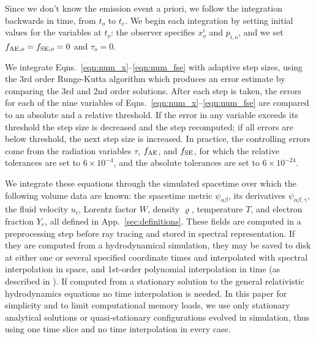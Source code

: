 \documentclass[aps,floatfix,prd,superscriptaddress,twocolumn]{revtex4-1}
\begin{document}
Since we don't know the emission event a priori,
we follow the integration backwards in time,
from $t_o$ to $t_e$.
We begin each integration by setting initial values for the variables at $t_o$:
the observer specifies $x^i_o$ and $p_{i,o}$,
and we set $f_{{\rm AE},o}=f_{{\rm SE},o}=0$ and $\tau_o=0$.

We integrate Eqns.~\ref{eqn:num_x}--\ref{eqn:num_fse} with adaptive step sizes,
using the 3rd order Runge-Kutta algorithm
which produces an error estimate by comparing the 3rd and 2nd order solutions.
After each step is taken, the errors for each of the nine variables of
Eqns.~\ref{eqn:num_x}--\ref{eqn:num_fse} are compared to an absolute and
a relative threshold.
If the error in any variable exceeds its threshold
the step size is decreased and the step recomputed;
if all errors are below threshold, the next step size is increased.
In practice, the controlling errors come from the radiation variables
$\tau$, $f_{\rm AE}$, and $f_{\rm SE}$,
for which the relative tolerances are set to $6\times10^{-4}$,
and the absolute tolerances are set to $6\times10^{-24}$.

We integrate these equations through the simulated spacetime
over which the following volume data are known:
the spacetime metric $\psi_{\alpha\beta}$,
its derivatives $\psi_{\alpha\beta,\gamma}$,
the fluid velocity $u_i$,
Lorentz factor $W$,
density $\varrho$,
temperature $T$,
and electron fraction $Y_e$,
all defined in App.~\ref{sec:definitions}.
These fields are computed in a preprocessing step before ray tracing
and stored in spectral representation.
If they are computed from a hydrodynamical simulation, they may be saved to disk
at either one or several specified coordinate times and interpolated
with spectral interpolation in space,
and 1st-order polynomial interpolation in time
(as described in \cite[App.~B]{bohn2016-code}).
If computed from a stationary solution to the
general relativistic hydrodynamics equations no time interpolation is needed.
In this paper for simplicity and to limit computational memory loads,
we use only stationary analytical solutions or
quasi-stationary configurations evolved in simulation,
thus using one time slice and no time interpolation in every case.
\end{document}
